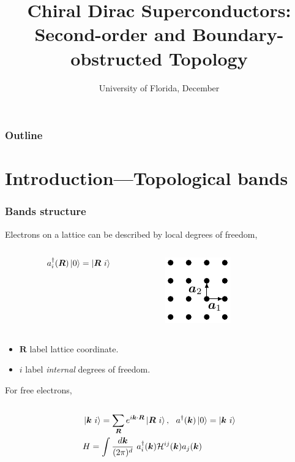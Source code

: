 \documentclass{beamer}
\title{Chiral Dirac Superconductors: Second-order and Boundary-obstructed Topology}
\date{University of Florida, December}
\newcommand{\mc}{\mathcal}
\renewcommand{\(}{\left(}
\renewcommand{\)}{\right)}
\renewcommand{\[}{\left[}
\renewcommand{\]}{\right]}
\begin{document}
\frame{\titlepage} 

\begin{frame}
    \frametitle{Outline}

    \tableofcontents
\end{frame}

\section{Introduction---Topological bands}
\begin{frame}
    \frametitle{Bands structure}
    Electrons on a lattice can be described by local degrees of freedom, 
    \begin{columns}
        \begin{column}{0.7\textwidth}
            \begin{align*}
                a^\dagger_i(\bm R) \ket{0} = \ket{\bm R \ i} 
            \end{align*}
            \vfill
        \end{column}
        \begin{column}{0.3\textwidth}
            \centering
            \includegraphics[]{square_lattice.pdf}
            \vfill
        \end{column}
    \end{columns}
    \begin{itemize}
        \item $\bm R$ label lattice coordinate.
        \item $i$ label \emph{internal} degrees of freedom.
    \end{itemize}\pause
    For free electrons, 
    \begin{columns}
        \begin{column}{0.7\textwidth}
            \begin{align*}
                &\ket{\bm k\  i} = \sum_{\bm R} e^{i\bm k \cdot \bm R} \ket{\bm R \ i}, \ \  a^{\dagger}(\bm k) \ket{0} = \ket{\bm k \ i} \\
                &H = \int \frac{d\bm k}{(2\pi)^{d}} \  a^\dagger_i(\bm k) \mc H^{ij}(\bm k) a_j(\bm k)
            \end{align*}
            \vfill
        \end{column}

\end{columns}
\end{frame}
\end{document}
